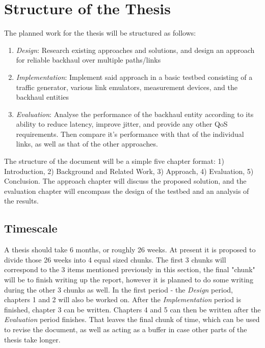 \section{Structure of the Thesis}
\label{sec:structure}

The planned work for the thesis will be structured as follows:

\begin{enumerate}
\item{\textit{Design}: Research existing approaches and solutions, and design an approach for reliable backhaul over multiple paths/links}
\item{\textit{Implementation}: Implement said approach in a basic testbed consisting of a traffic generator, various link emulators, measurement devices, and the backhaul entities}
\item{\textit{Evaluation}: Analyse the performance of the backhaul entity according to its ability to reduce latency, improve jitter, and provide any other QoS requirements. Then compare it's performance with that of the individual links, as well as that of the other approaches.}

\end{enumerate}

The structure of the document will be a simple five chapter format: 1) Introduction, 2) Background and Related Work, 3) Approach, 4) Evaluation, 5) Conclusion. The approach chapter will discuss the proposed solution, and the evaluation chapter will encompass the design of the testbed and an analysis of the results.

\subsection{Timescale}

A thesis should take 6 months, or roughly 26 weeks. At present it is proposed to divide those 26 weeks into 4 equal sized chunks. The first 3 chunks will correspond to the 3 items mentioned previously in this section, the final "chunk" will be to finish writing up the report, however it is planned to do some writing during the other 3 chunks as well. In the first period - the \textit{Design} period, chapters 1 and 2 will also be worked on. After the \textit{Implementation} period is finished, chapter 3 can be written. Chapters 4 and 5 can then be written after the \textit{Evaluation} period finishes. That leaves the final chunk of time, which can be used to revise the document, as well as acting as a buffer in case other parts of the thesis take longer.


